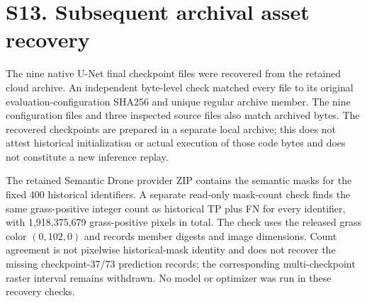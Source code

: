 \section*{S13. Subsequent archival asset recovery}
The nine native U-Net final checkpoint files were recovered from the retained cloud archive. An independent byte-level check matched every file to its original evaluation-configuration SHA256 and unique regular archive member. The nine configuration files and three inspected source files also match archived bytes. The recovered checkpoints are prepared in a separate local archive; this does not attest historical initialization or actual execution of those code bytes and does not constitute a new inference replay.

The retained Semantic Drone provider ZIP contains the semantic masks for the fixed 400 historical identifiers. A separate read-only mask-count check finds the same grass-positive integer count as historical TP plus FN for every identifier, with 1,918,375,679 grass-positive pixels in total. The check uses the released grass color $(0,102,0)$ and records member digests and image dimensions. Count agreement is not pixelwise historical-mask identity and does not recover the missing checkpoint-37/73 prediction records; the corresponding multi-checkpoint raster interval remains withdrawn. No model or optimizer was run in these recovery checks.
